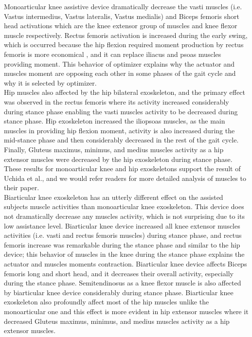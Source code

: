 \documentclass[10pt,letterpaper]{article}
\begin{document}
Monoarticular knee assistive device dramatically decrease the vasti muscles (i.e. Vastus intermedius, Vastus lateralis, Vastus medialis) and Biceps femoris short head activations which are the knee extensor group of muscles and knee flexor muscle respectively. Rectus femoris activation is increased during the early swing, which is occurred because the hip flexion required moment production by rectus femoris is more economical \cite{2,93}, and it can replace iliacus and psoas muscles providing moment. This behavior of optimizer explains why the actuator and muscles moment are opposing each other in some phases of the gait cycle and why it is selected by optimizer.\\
Hip muscles also affected by the hip bilateral exoskeleton, and the primary effect was observed in the rectus femoris where its activity increased considerably during stance phase enabling the vasti muscles activity to be decreased during stance phase. Hip exoskeleton increased the iliopsoas muscles, as the main muscles in providing hip flexion moment, activity is also increased during the mid-stance phase and then considerably decreased in the rest of the gait cycle. Finally, Gluteus maximus, minimus, and medius muscles activity as a hip extensor muscles were decreased by the hip exoskeleton during stance phase.
These results for monoarticular knee and hip exoskeletons support the result of Uchida et al.\cite{2}, and we would refer readers for more detailed analysis of muscles to their paper.\\
Biarticular knee exoskeleton has an utterly different effect on the assisted subjects muscle activities than monoarticular knee exoskeleton. This device does not dramatically decrease any muscles activity, which is not surprising due to its low assistance level. Biarticular knee device increased all knee extensor muscles activities (i.e. vasti and rectus femoris muscles) during stance phase, and rectus femoris increase was remarkable during the stance phase and similar to the hip device; this behavior of muscles in the knee during the stance phase explains the actuator and muscles moments contraction. Biarticular knee device affects Biceps femoris long and short head, and it decreases their overall activity, especially during the stance phase. Semitendinosus as a knee flexor muscle is also affected by biarticular knee device considerably during stance phase. Biarticular knee exoskeleton also profoundly affect most of the hip muscles unlike the monoarticular one and this effect is more evident in hip extensor muscles where it decreased Gluteus maximus, minimus, and medius muscles activity as a hip extensor muscles.\\
\end{document}
